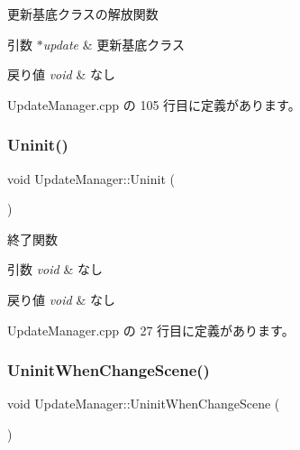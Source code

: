 更新基底クラスの解放関数 


\begin{DoxyParams}{引数}
{\em $\ast$update} & 更新基底クラス \\
\hline
\end{DoxyParams}

\begin{DoxyRetVals}{戻り値}
{\em void} & なし \\
\hline
\end{DoxyRetVals}


 Update\+Manager.\+cpp の 105 行目に定義があります。

\mbox{\label{class_update_manager_a389f9047e882de587eb4def0c691909d}} 
\subsubsection{\texorpdfstring{Uninit()}{Uninit()}}
{\footnotesize\ttfamily void Update\+Manager\+::\+Uninit (\begin{DoxyParamCaption}{ }\end{DoxyParamCaption})}



終了関数 


\begin{DoxyParams}{引数}
{\em void} & なし \\
\hline
\end{DoxyParams}

\begin{DoxyRetVals}{戻り値}
{\em void} & なし \\
\hline
\end{DoxyRetVals}


 Update\+Manager.\+cpp の 27 行目に定義があります。

\mbox{\label{class_update_manager_a2e0a6b1a620ba620783d929e532b6148}} 
\subsubsection{\texorpdfstring{Uninit\+When\+Change\+Scene()}{UninitWhenChangeScene()}}
{\footnotesize\ttfamily void Update\+Manager\+::\+Uninit\+When\+Change\+Scene (\begin{DoxyParamCaption}{ }\end{DoxyParamCaption})}



